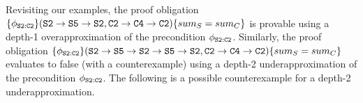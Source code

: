 Revisiting our examples,
the proof obligation $\{\phi_{{\tt S2:C2}}\} ({\tt S2\rightarrow S5\rightarrow S2},\\ {\tt C2\rightarrow C4\rightarrow C2}) \{sum_{S} = sum_{C}\}$ is
provable using a depth-1 overapproximation of the
precondition $\phi_{{\tt S2:C2}}$.
Similarly, the proof obligation
$\{\phi_{{\tt S2:C2}}\} ({\tt S2\rightarrow S5\rightarrow S2\rightarrow S5\rightarrow S2}, {\tt C2\rightarrow C4\rightarrow C2}) \{sum_{S} = sum_{C}\}$
evaluates to false (with a counterexample) using
a depth-2 underapproximation of the precondition $\phi_{{\tt S2:C2}}$.
The following is a possible counterexample for a depth-2 underapproximation.
%
